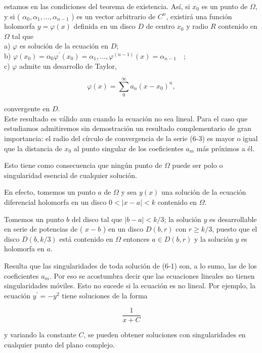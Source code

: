 \documentclass[10pt]{article}
\theoremstyle{plain}
\theoremstyle{definition}
\theoremstyle{remark}
\begin{document}
estamos en las condiciones del teorema de existencia. Así, si $x_{0}$ es un punto de $\Omega$, y si ( $\alpha_{0}, \alpha_{1}, \ldots, \alpha_{n-1}$ ) es un vector arbitrario de $C^{n}$, existirá una función holomorfa $y=\varphi(x)$ definida en un disco $D$ de centro $x_{0}$ y radio $R$ contenido en $\Omega$ tal que\\
a) $\varphi$ es solución de la ecuación en $D$;\\
b) $\varphi\left(x_{0}\right)=\alpha_{0} \varphi^{\prime}\left(x_{0}\right)=\alpha_{1}, \ldots, \varphi^{(n-1)}(x)=\alpha_{n-1} \quad$;\\
c) $\varphi$ admite un desarrollo de Taylor,


\begin{equation*}
\varphi(x)=\sum_{0}^{\infty} a_{n}\left(x-x_{0}\right)^{n}, \tag{6-3}
\end{equation*}


convergente en $D$.\\
Este resultado es válido aun cuando la ecuación no sea lineal. Para el caso que estudiamos admitiremos sin demostración un resultado complementario de gran importancia: el radio del círculo de convergencia de la serie (6-3) es mayor o igual que la distancia de $x_{0}$ al punto singular de los coeficientes $a_{m}$ más próximos a él.

Esto tiene como consecuencia que ningún punto de $\Omega$ puede ser polo o singularidad esencial de cualquier solución.

En efecto, tomemos un punto $a$ de $\Omega$ y sea $y(x)$ una solución de la ecuación diferencial holomorfa en un disco $0<|x-a|<k$ contenido en $\Omega$.

Tomemos un punto $b$ del disco tal que $|b-a|<k / 3$; la solución $y$ es desarrollable en serie de potencias de ( $x-b$ ) en un disco $D(b, r)$ con $r \geqslant k / 3$, puesto que el disco $D(b, k / 3)$ está contenido en $\Omega$ entonces $a \in D(b, r)$ y la solución $y$ es holomorfa en $a$.

Resulta que las singularidades de toda solución de (6-1) son, a lo sumo, las de los coeficientes $a_{m}$. Por eso se acostumbra decir que las ecuaciones lineales no tienen singularidades móviles. Esto no sucede si la ecuación es no lineal. Por ejemplo, la ecuación $y^{\prime}=-y^{2}$ tiene soluciones de la forma

$$
\frac{1}{x+C}
$$

y variando la constante $C$, se pueden obtener soluciones con singularidades en cualquier punto del plano complejo.
\end{document}
